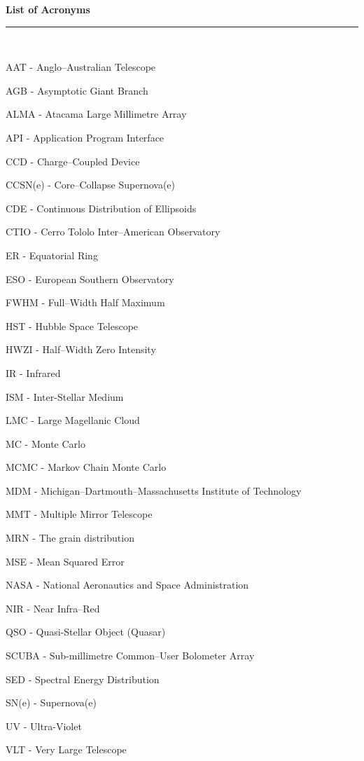 \thispagestyle{empty}
\begin{raggedleft}
\vspace*{23mm}
\hfill {\huge {\bf {List of Acronyms}}} \\
\vspace{6mm}
\hfill \rule{4in}{.015in} \\
\vspace{19mm}
\end{raggedleft}




%
%

AAT - Anglo--Australian Telescope

AGB - Asymptotic Giant Branch

ALMA - Atacama Large Millimetre Array

API - Application Program Interface

CCD - Charge--Coupled Device

CCSN(e) - Core--Collapse Supernova(e)

CDE - Continuous Distribution of Ellipsoids

CTIO - Cerro Tololo Inter--American Observatory

ER - Equatorial Ring

ESO - European Southern Observatory

FWHM - Full--Width Half Maximum

HST - Hubble Space Telescope

HWZI - Half--Width Zero Intensity

IR - Infrared

ISM - Inter-Stellar Medium

LMC - Large Magellanic Cloud

MC - Monte Carlo

MCMC - Markov Chain Monte Carlo 

MDM - Michigan--Dartmouth--Massachusetts Institute of Technology

MMT - Multiple Mirror Telescope

MRN - The \citet*{Mathis1977} grain distribution

MSE - Mean Squared Error

NASA - National Aeronautics and Space Administration

NIR - Near Infra--Red

QSO - Quasi-Stellar Object (Quasar)

SCUBA - Sub-millimetre Common--User Bolometer Array

SED - Spectral Energy Distribution

SN(e) - Supernova(e)

UV - Ultra-Violet

VLT - Very Large Telescope

